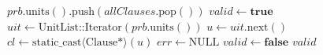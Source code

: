 \begin{algorithm}[H]
\begin{algorithmic}[1]
            \State $prb.\text{units}().\text{push}(allClauses.\text{pop}())$
        \EndWhile
        \State $valid \leftarrow \textbf{true}$
        \State $uit \leftarrow \text{UnitList::Iterator}(prb.\text{units}())$
            \State $u \leftarrow uit.\text{next}()$
                \State $cl \leftarrow \text{static\_cast}\langle\text{Clause}*\rangle(u)$
                \State $err \leftarrow \text{NULL}$
                    \State $valid \leftarrow \textbf{false}$
                \EndIf
            \EndIf
        \EndWhile
        \State \Return $valid$
    \EndFunction
\end{algorithmic}
\end{algorithm}



